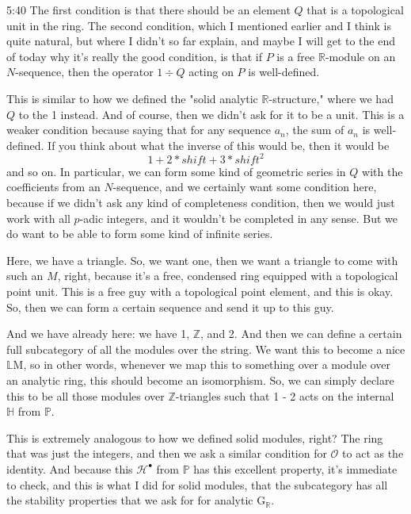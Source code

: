 \begin{unfinished}{5:40}
The first condition is that there should be an element $Q$ that is a topological unit in the ring. The second condition, which I mentioned earlier and I think is quite natural, but where I didn't so far explain, and maybe I will get to the end of today why it's really the good condition, is that if $P$ is a free $\mathbb{R}$-module on an $N$-sequence, then the operator $1 \div Q$ acting on $P$ is well-defined.

This is similar to how we defined the "solid analytic $\mathbb{R}$-structure," where we had $Q$ to the 1 instead. And of course, then we didn't ask for it to be a unit. This is a weaker condition because saying that for any sequence $a_n$, the sum of $a_n$ is well-defined. If you think about what the inverse of this would be, then it would be
\[ 1 + 2 * shift + 3 * shift^2 \]
and so on. In particular, we can form some kind of geometric series in $Q$ with the coefficients from an $N$-sequence, and we certainly want some condition here, because if we didn't ask any kind of completeness condition, then we would just work with all $p$-adic integers, and it wouldn't be completed in any sense. But we do want to be able to form some kind of infinite series.

Here, we have a triangle. So, we want one, then we want a triangle to come with such an $M$, right, because it's a free, condensed ring equipped with a topological point unit. This is a free guy with a topological point element, and this is okay. So, then we can form a certain sequence and send it up to this guy.

And we have already here: we have 1, $\mathbb{Z}$, and 2. And then we can define a certain full subcategory of all the modules over the string. We want this to become a nice $\mathbb{L}$M, so in other words, whenever we map this to something over a module over an analytic ring, this should become an isomorphism. So, we can simply declare this to be all those modules over $\mathbb{Z}$-triangles such that 1 - 2 acts on the internal $\mathbb{H}$ from $\mathbb{P}$.

This is extremely analogous to how we defined solid modules, right? The ring that was just the integers, and then we ask a similar condition for $\mathcal{O}$ to act as the identity. And because this $\mathcal{H}^{\bullet}$ from $\mathbb{P}$ has this excellent property, it's immediate to check, and this is what I did for solid modules, that the subcategory has all the stability properties that we ask for for analytic $\mathrm{G}_{\mathbb{R}}$.


\end{unfinished}
